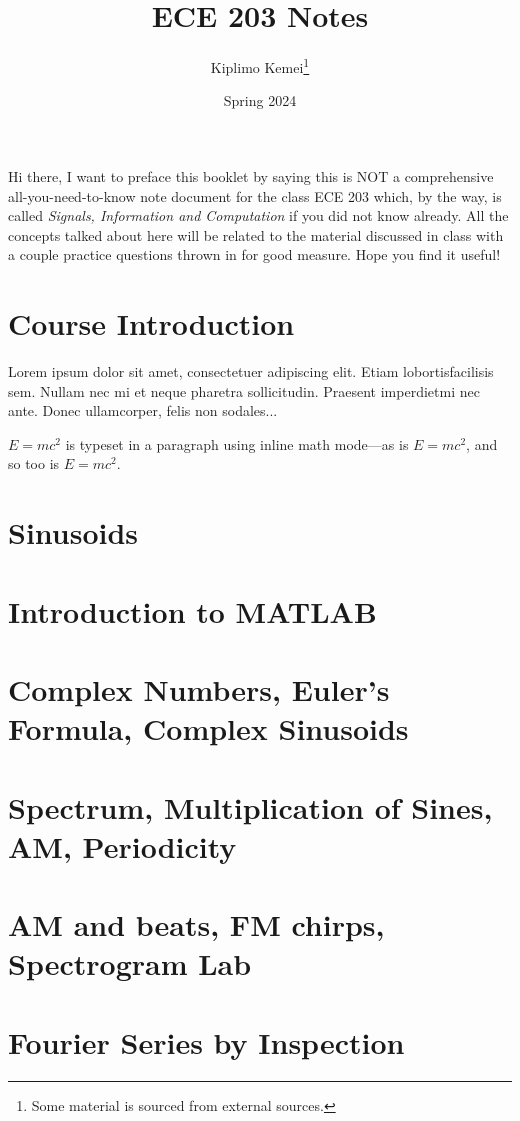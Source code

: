 \documentclass[12pt, letterpaper]{article}
\title{ECE 203 Notes}
\author{Kiplimo Kemei\thanks{Some material is sourced from external sources.}}
\date{Spring 2024}
\begin{document}
\maketitle
Hi there, I want to preface this booklet by saying this is NOT a comprehensive 
all-you-need-to-know note document for the class ECE 203 which,
by the way, is called \emph{Signals, Information and Computation} if you 
did not know already. All the concepts talked about here will 
be related to the material discussed in class with a couple practice 
questions thrown in for good measure. Hope you find it useful!

\newpage
\tableofcontents
\newpage

\section{Course Introduction}      
Lorem  ipsum  dolor  sit  amet,  consectetuer  adipiscing  
elit.   Etiam  lobortisfacilisis sem.  Nullam nec mi et 
neque pharetra sollicitudin.  Praesent imperdietmi nec ante. 
Donec ullamcorper, felis non sodales...

\space
\begin{math}
    E=mc^2
\end{math} is typeset in a paragraph using inline math mode---as is $E=mc^2$, and so too is \(E=mc^2\).

\section{Sinusoids}   
\section{Introduction to MATLAB}   
\section{Complex Numbers, Euler's Formula, Complex Sinusoids}   
\section{Spectrum, Multiplication of Sines, AM, Periodicity}
\section{AM and beats, FM chirps, Spectrogram Lab}
\section{Fourier Series by Inspection}
\end{document}
